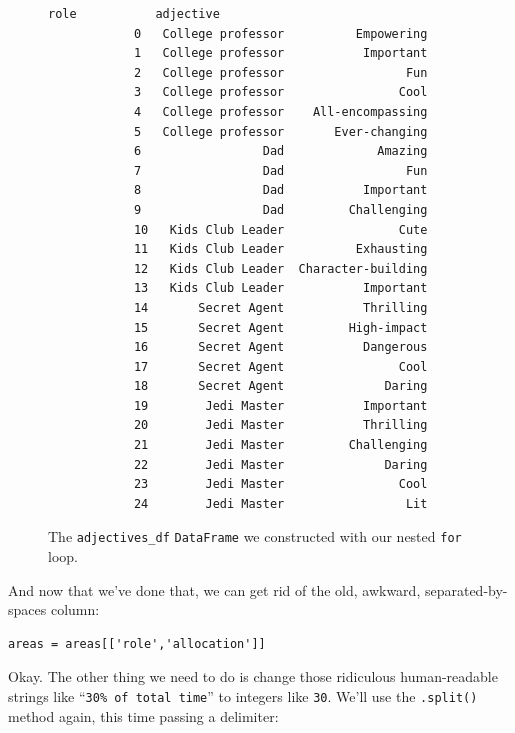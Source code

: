 \begin{figure}[ht]
\centering
\begin{Verbatim}[fontsize=\footnotesize,samepage=true,frame=leftline,framesep=5mm,framerule=1mm]
                             role           adjective
            0   College professor          Empowering
            1   College professor           Important
            2   College professor                 Fun
            3   College professor                Cool
            4   College professor    All-encompassing
            5   College professor       Ever-changing
            6                 Dad             Amazing
            7                 Dad                 Fun
            8                 Dad           Important
            9                 Dad         Challenging
            10   Kids Club Leader                Cute
            11   Kids Club Leader          Exhausting
            12   Kids Club Leader  Character-building
            13   Kids Club Leader           Important
            14       Secret Agent           Thrilling
            15       Secret Agent         High-impact
            16       Secret Agent           Dangerous
            17       Secret Agent                Cool
            18       Secret Agent              Daring
            19        Jedi Master           Important
            20        Jedi Master           Thrilling
            21        Jedi Master         Challenging
            22        Jedi Master              Daring
            23        Jedi Master                Cool
            24        Jedi Master                 Lit
\end{Verbatim}
\caption{The \texttt{adjectives\_df} \texttt{DataFrame} we constructed with our
nested \texttt{for} loop.}
\label{adjectives_df}
\end{figure}

And now that we've done that, we can get rid of the old, awkward,
separated-by-spaces column:

\begin{Verbatim}[fontsize=\footnotesize,samepage=true,frame=single,framesep=3mm]
areas = areas[['role','allocation']]
\end{Verbatim}

Okay. The other thing we need to do is change those ridiculous human-readable
strings like ``\texttt{30\% of total time}'' to integers like \texttt{30}.
We'll use the \texttt{.split()} method again, this time passing a delimiter:


